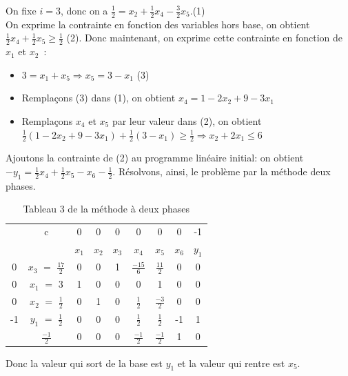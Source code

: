 On fixe $i = 3$, donc on a $\frac{1}{2} = x_{2} + \frac{1}{2} x_{4} - \frac{3}{2} x_{5}$.(1)\\
On exprime la contrainte en fonction des variables hors base, on obtient $\frac{1}{2} x_{4} + \frac{1}{2} x_{5} \geqslant \frac{1}{2}$ (2). Donc maintenant, on exprime cette contrainte en fonction de $x_{1}$ et $x_{2}$~:
\begin{itemize}
\item $3 = x_{1} + x_{5} \Longrightarrow x_{5} = 3 - x_{1}$ (3)
\item Remplaçons (3) dans (1), on obtient $x_{4} = 1 - 2x_{2} + 9 - 3x_{1}$
\item Remplaçons $x_{4}$ et $x_{5}$ par leur valeur dans (2), on obtient $\frac{1}{2}(1 - 2x_{2} + 9 - 3x_{1}) + \frac{1}{2} (3 - x_{1}) \geqslant \frac{1}{2} \Longrightarrow x_{2} + 2x_{1} \leqslant 6$ 
\end{itemize}
Ajoutons la contrainte de (2) au programme linéaire initial: on obtient $-y_{1} = \frac{1}{2}x_{4} + \frac{1}{2}x_{5} - x_{6} - \frac{1}{2}$. Résolvons, ainsi, le problème par la méthode deux phases.\\
\begin{table}
\begin{tabular}{|c|c|c|c|c|c|c|c|c|}
	\hline
      & c & 0 & 0 & 0 & 0 & 0 & 0 & -1 \\ 
      \cline{2-9}
       &  & $x_{1}$ & $x_{2}$  & $x_{3}$  & $x_{4}$ & $x_{5}$ & $x_{6}$ & $y_{1}$ \\
       \hline
   0 & $x_{3}$  $=$ $\frac{17}{2}$ & 0 & 0 & 1 & $\frac{-15}{6}$ & $\frac{11}{2}$ & 0 & 0 \\
      \hline
	0 & $x_{1}$ $=$ 3 & 1 & 0 & 0 & 0 & 1 & 0 & 0 \\
	  \hline
	0 & $x_{2}$ $=$ $\frac{1}{2}$  & 0 & 1 & 0 & $\frac{1}{2}$ & $\frac{-3}{2}$ & 0 & 0\\
	  \hline
	-1 & $y_{1}$ $=$ $\frac{1}{2}$  & 0 & 0 & 0 & $\frac{1}{2}$ & $\frac{1}{2}$ & -1 & 1\\
	  \hline
	 & $\frac{-1}{2}$ & 0 & 0 & 0 & $\frac{-1}{2}$ & $\frac{-1}{2}$ & 1 & 0\\
	  \hline
	\end{tabular}
\caption{Tableau 3 de la méthode à deux phases}
\end{table}
Donc la valeur qui sort de la base est $y_{1}$ et la valeur qui rentre est $x_{5}$.
